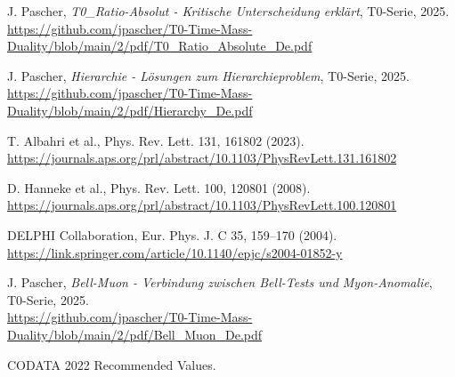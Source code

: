 \documentclass[12pt,a4paper]{article}
\begin{document}
\begin{thebibliography}{99}
		 J. Pascher, \textit{T0\_Ratio-Absolut - Kritische Unterscheidung erklärt}, T0-Serie, 2025. \\
		\url{https://github.com/jpascher/T0-Time-Mass-Duality/blob/main/2/pdf/T0_Ratio_Absolute_De.pdf}
		
		 J. Pascher, \textit{Hierarchie - Lösungen zum Hierarchieproblem}, T0-Serie, 2025. \\
		\url{https://github.com/jpascher/T0-Time-Mass-Duality/blob/main/2/pdf/Hierarchy_De.pdf}
		
		 T. Albahri et al., Phys. Rev. Lett. 131, 161802 (2023). \\
		\url{https://journals.aps.org/prl/abstract/10.1103/PhysRevLett.131.161802}
		
		 D. Hanneke et al., Phys. Rev. Lett. 100, 120801 (2008). \\
		\url{https://journals.aps.org/prl/abstract/10.1103/PhysRevLett.100.120801}
		
		 DELPHI Collaboration, Eur. Phys. J. C 35, 159--170 (2004). \\
		\url{https://link.springer.com/article/10.1140/epjc/s2004-01852-y}
		
		 J. Pascher, \textit{Bell-Muon - Verbindung zwischen Bell-Tests und Myon-Anomalie}, T0-Serie, 2025. \\
		\url{https://github.com/jpascher/T0-Time-Mass-Duality/blob/main/2/pdf/Bell_Muon_De.pdf}
		
		 CODATA 2022 Recommended Values.
	\end{thebibliography}
	
\end{document}

